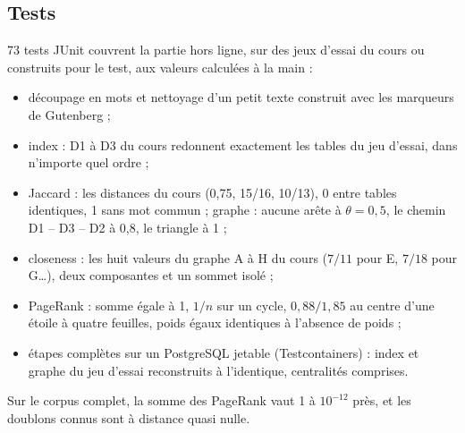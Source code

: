 \subsection{Tests}
\label{sec:testshorsligne}

73 tests JUnit couvrent la partie hors ligne, sur des jeux d'essai du
cours ou construits pour le test, aux valeurs calculées à la
main :
\begin{itemize}[nosep]
  \item découpage en mots et nettoyage d'un petit texte construit avec les
        marqueurs de Gutenberg ;
  \item index : D1 à D3 du cours redonnent exactement les tables du jeu
        d'essai, dans n'importe quel ordre ;
  \item Jaccard : les distances du cours (0,75, 15/16, 10/13), 0 entre tables
        identiques, 1 sans mot commun ; graphe : aucune arête à $\theta = 0{,}5$,
        le chemin D1 -- D3 -- D2 à 0,8, le triangle à 1 ;
  \item closeness : les huit valeurs du graphe A à H du cours ($7/11$ pour E,
        $7/18$ pour G\dots), deux composantes et un sommet isolé ;
  \item PageRank : somme égale à 1, $1/n$ sur un cycle, $0{,}88/1{,}85$ au
        centre d'une étoile à quatre feuilles, poids égaux identiques à
        l'absence de poids ;
  \item étapes complètes sur un PostgreSQL jetable (Testcontainers) : index et
        graphe du jeu d'essai reconstruits à l'identique, centralités comprises.
\end{itemize}
Sur le corpus complet, la somme des PageRank vaut 1 à $10^{-12}$ près, et les
doublons connus sont à distance quasi nulle.
